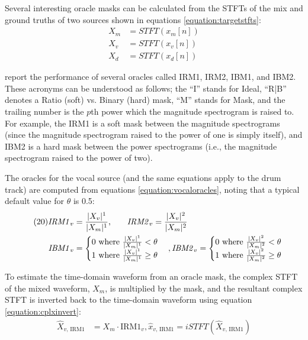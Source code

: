 \documentclass[report.tex]{subfiles}
\begin{document}
Several interesting oracle masks can be calculated from the STFTs of the mix and ground truths of two sources shown in equations \eqref{equation:targetstfts}:
\begin{align}\tag{19}\label{equation:targetstfts}
	\nonumber X_{m} &= \mathit{STFT}(x_{m}[n])\\
	\nonumber X_{v} &= \mathit{STFT}(x_{v}[n])\\
	\nonumber X_{d} &= \mathit{STFT}(x_{d}[n])
\end{align}
 
\textcite{sisec2018} report the performance of several oracles called IRM1, IRM2, IBM1, and IBM2. These acronyms can be understood as follows; the ``I'' stands for Ideal, ``R|B'' denotes a Ratio (soft) vs. Binary (hard) mask, ``M'' stands for Mask, and the trailing number is the $p$th power which the magnitude spectrogram is raised to. For example, the IRM1 is a soft mask between the magnitude spectrograms (since the magnitude spectrogram raised to the power of one is simply itself), and IBM2 is a hard mask between the power spectrograms (i.e., the magnitude spectrogram raised to the power of two).

The oracles for the vocal source (and the same equations apply to the drum track) are computed from equations \eqref{equation:vocaloracles}, noting that a typical default value for $\theta$ is 0.5:
\begin{align}\tag{20}\label{equation:vocaloracles}
	\nonumber \mathit{IRM1}_{v} &= \frac{|X_{v}|^{1}}{|X_{m}|^{1}}\text{,\qquad}
	\nonumber \mathit{IRM2}_{v} = \frac{|X_{v}|^{2}}{|X_{m}|^{2}}\\
	\nonumber \mathit{IBM1}_{v} &= \begin{cases}
		0 \text{ where } \frac{|X_{v}|^{1}}{|X_{m}|^{1}} < \theta\\
		1 \text{ where } \frac{|X_{v}|^{1}}{|X_{m}|^{1}} \ge \theta
	\end{cases},
	\nonumber \mathit{IBM2}_{v} = \begin{cases}
		0 \text{ where } \frac{|X_{v}|^{2}}{|X_{m}|^{2}} < \theta\\
		1 \text{ where } \frac{|X_{v}|^{2}}{|X_{m}|^{2}} \ge \theta
	\end{cases}
\end{align}

To estimate the time-domain waveform from an oracle mask, the complex STFT of the mixed waveform, $X_{m}$, is multiplied by the mask, and the resultant complex STFT is inverted back to the time-domain waveform using equation \eqref{equation:cplxinvert}:
\begin{align}\tag{21}\label{equation:cplxinvert}
	\nonumber \hat{X}_{v\text{, IRM1}} &= X_{m} \cdot \text{IRM1}_{v}, \hat{x}_{v\text{, IRM1}} = \mathit{iSTFT}(\hat{X}_{v\text{, IRM1}})
\end{align}
\end{document}
